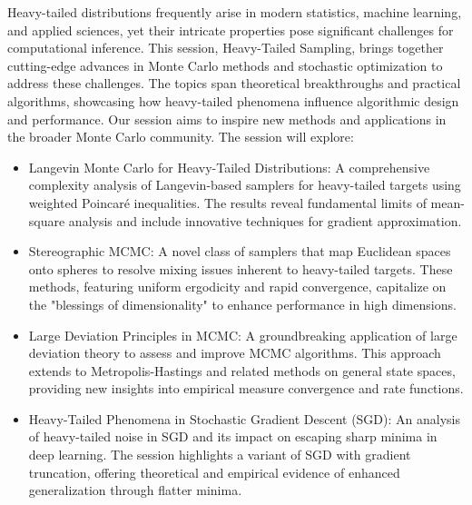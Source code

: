 \begin{session}
 {}%
 {}%
 Heavy-tailed distributions frequently arise in modern statistics, machine learning, and applied sciences, yet their intricate properties pose significant challenges for computational inference. This session, Heavy-Tailed Sampling, brings together cutting-edge advances in Monte Carlo methods and stochastic optimization to address these challenges. The topics span theoretical breakthroughs and practical algorithms, showcasing how heavy-tailed phenomena influence algorithmic design and performance. Our session aims to inspire new methods and applications in the broader Monte Carlo community. The session will explore:
 \begin{itemize}
 \item
 Langevin Monte Carlo for Heavy-Tailed Distributions: A comprehensive complexity analysis of Langevin-based samplers for heavy-tailed targets using weighted Poincaré inequalities. The results reveal fundamental limits of mean-square analysis and include innovative techniques for gradient approximation.
 \item
 Stereographic MCMC: A novel class of samplers that map Euclidean spaces onto spheres to resolve mixing issues inherent to heavy-tailed targets. These methods, featuring uniform ergodicity and rapid convergence, capitalize on the "blessings of dimensionality" to enhance performance in high dimensions.
 \item
 Large Deviation Principles in MCMC: A groundbreaking application of large deviation theory to assess and improve MCMC algorithms. This approach extends to Metropolis-Hastings and related methods on general state spaces, providing new insights into empirical measure convergence and rate functions.
 \item
 Heavy-Tailed Phenomena in Stochastic Gradient Descent (SGD): An analysis of heavy-tailed noise in SGD and its impact on escaping sharp minima in deep learning. The session highlights a variant of SGD with gradient truncation, offering theoretical and empirical evidence of enhanced generalization through flatter minima.
 \end{itemize}
\end{session}



\clearpage

